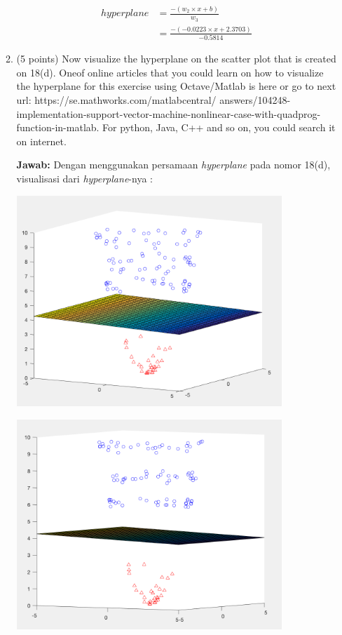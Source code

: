 \documentclass[12pt]{article}%
\begin{document}
\begin{enumerate}
\begin{enumerate}
		\begin{align*}
		 	hyperplane & = \frac{-(w_2 \times x + b)}{w_3} \\
		 	& = \frac{-(-0.0223 \times x + 2.3703)}{-0.5814}
		\end{align*}

		\item (5 points) Now visualize the hyperplane on the scatter plot that is created on 18(d). Oneof online articles that you could learn on how to visualize the hyperplane for this exercise using Octave/Matlab is here or go to next url: https://se.mathworks.com/matlabcentral/ answers/104248-implementation-support-vector-machine-nonlinear-case-with-quadprog- function-in-matlab. For python, Java, C++ and so on, you could search it on internet.

		\par \textbf{Jawab:} Dengan menggunakan persamaan \textit{hyperplane} pada nomor 18(d), visualisasi dari \textit{hyperplane}-nya :

		\par \includegraphics[width=10cm]{ass2clo3no18_7}	
		\par \includegraphics[width=10cm]{ass2clo3no18_8}
	\end{enumerate}
	


\end{enumerate}
\end{document}
